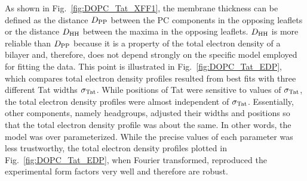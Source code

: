 As shown in Fig.~\ref{fig:DOPC_Tat_XFF1}, the membrane thickness can be defined
as the distance $D_\textrm{PP}$ between the PC components in the opposing leaflets
or the distance $D_\textrm{HH}$ between the maxima in the opposing leaflets. $D_\textrm{HH}$
is more reliable than $D_\textrm{PP}$ because it is a property of the total 
electron density of a bilayer and, therefore, does not depend strongly on the 
specific model employed for fitting the data. 
This point is illustrated in Fig.~\ref{fig:DOPC_Tat_EDP}, which compares total electron
density profiles resulted from best fits with three different Tat widths $\sigma_\textrm{Tat}$.
While positions of Tat were sensitive to values of $\sigma_\textrm{Tat}$, the total 
electron density profiles were almost independent of $\sigma_\textrm{Tat}$. Essentially,
other components, namely headgroups, adjusted their widths and positions so that
the total electron density profile was about the same.  In other words,
the model was over parameterized.
While the precise values of each parameter was less trustworthy,
the total electron density profiles plotted in Fig.~\ref{fig:DOPC_Tat_EDP},
when Fourier transformed, reproduced the experimental form factors very well
and therefore are robust. 

